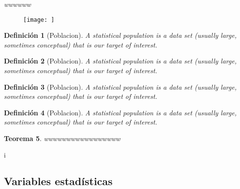 \documentclass[a4paper]{report}
\newtheorem{thm}{Teorema}[chapter]
\newtheorem{defn}[thm]{Definición}
\begin{document}
\it{wwwwww}

\begin{figure}[ht!	]
	\centering
	\texttt{[image: ]}
	\caption{}
	\label{fig:}
\end{figure}

\begin{defn}[Poblacion]
	A statistical population is a data set (usually large, sometimes conceptual) that is our target of interest.
\end{defn}
\begin{defn}[Poblacion]
	A statistical population is a data set (usually large, sometimes conceptual) that is our target of interest.
\end{defn}
\begin{defn}[Poblacion]
	A statistical population is a data set (usually large, sometimes conceptual) that is our target of interest.
\end{defn}
\begin{defn}[Poblacion]
	A statistical population is a data set (usually large, sometimes conceptual) that is our target of interest.
\end{defn}
\begin{thm}
	wwwwwwwwwwwwwwwww
\end{thm}i
\subsection{Variables estadísticas}
\end{document}
